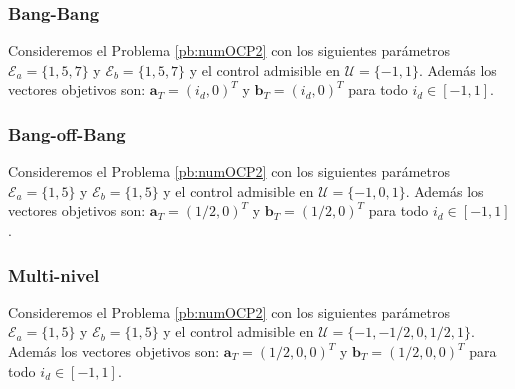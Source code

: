 \subsubsection{Bang-Bang}
Consideremos el Problema \ref{pb:numOCP2} con los siguientes parámetros $\mathcal{E}_a = \{1,5,7\}$ y  $\mathcal{E}_b = \{1,5,7\}$ y el control admisible en $\mathcal{U} = \{-1,1\}$. Además los vectores objetivos son: $\bm{a}_T = (i_d,0)^T$ y $\bm{b}_T = (i_d,0)^T$ para todo $i_d \in [-1,1]$. 

\subsubsection{Bang-off-Bang}
Consideremos el Problema \ref{pb:numOCP2} con los siguientes parámetros $\mathcal{E}_a = \{1,5\}$ y  $\mathcal{E}_b = \{1,5\}$ y el control admisible en $\mathcal{U} = \{-1,0,1\}$. Además los vectores objetivos son: $\bm{a}_T = (1/2,0)^T$ y $\bm{b}_T = (1/2,0)^T$  para todo $i_d \in [-1,1]$. 

\subsubsection{Multi-nivel}

Consideremos el Problema \ref{pb:numOCP2} con los siguientes parámetros $\mathcal{E}_a = \{1,5\}$ y  $\mathcal{E}_b = \{1,5\}$ y el control admisible en $\mathcal{U} = \{-1,-1/2,0,1/2,1\}$. Además los vectores objetivos son: $\bm{a}_T = (1/2,0,0)^T$ y $\bm{b}_T = (1/2,0,0)^T$  para todo $i_d \in [-1,1]$.  
